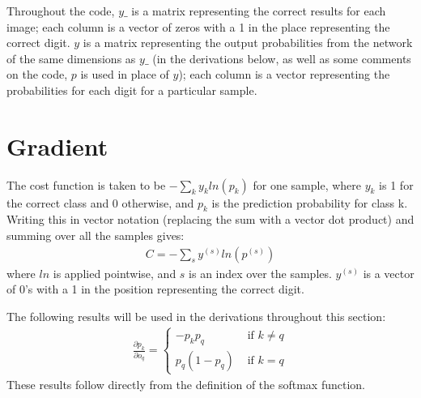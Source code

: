 \documentclass{article}
\begin{document}
   Throughout the code, $y\_$ is a matrix representing the correct results for each image; each column is a
   vector of zeros with a 1 in the place representing the correct digit.
   $y$ is a matrix representing the output probabilities from the network of the same dimensions
   as $y\_$ (in the derivations below, as well as some comments on the code, $p$ is used in place of $y$);
   each column is a vector representing the probabilities for each digit for a particular sample.

   \section{Gradient}
   The cost function is taken to be $- \sum_{k} y_k ln(p_k)$ for one sample, where $y_k$ is
   1 for the correct class and 0 otherwise, and $p_k$ is the prediction probability for class k.
   Writing this in vector notation (replacing the sum with a vector dot product) and
   summing over all the samples gives:
      \begin{equation*} \begin{split}
         C = - \sum_{s} y^{(s)} ln(p^{(s)})
      \end{split} \end{equation*}
   where $ln$ is applied pointwise, and $s$ is an index over the samples. $y^{(s)}$ is
   a vector of 0's with a 1 in the position representing the correct digit.

   The following results will be used in the derivations throughout this section:
      \begin{equation*} \begin{split}
        \frac{ \partial p_k}{ \partial o_q } =
            \begin{cases}
               -p_k p_q       & \textrm{ if } k \neq q \\
               p_q (1 - p_q)  & \textrm{ if } k = q
            \end{cases}
      \end{split} \end{equation*}
   These results follow directly from the definition of the softmax function.
\end{document}
